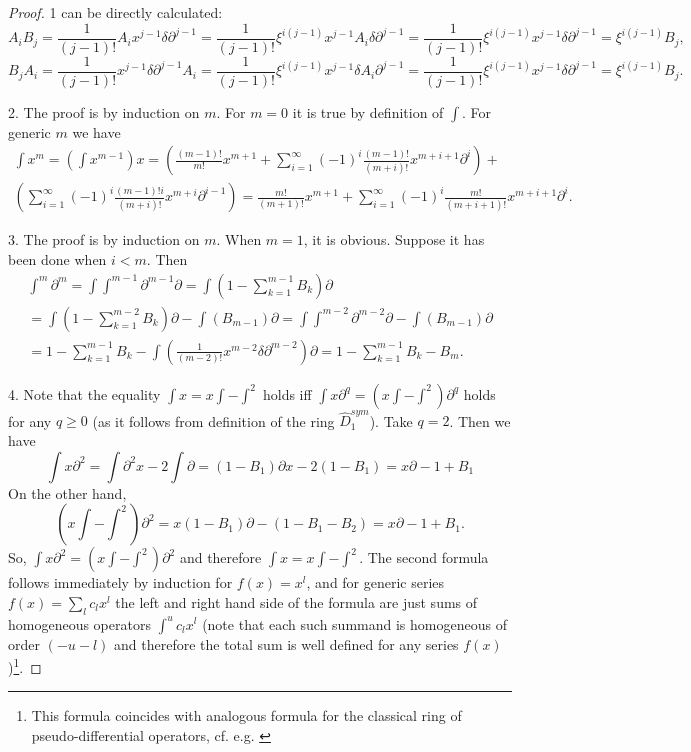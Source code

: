 \documentclass[11pt]{article}
\theoremstyle{definition}
\theoremstyle{plain}
\numberwithin{equation}{section}
\begin{document}
\begin{proof} 	
	1 can be directly calculated:
	$$
	A_{i}B_{j}=\frac{1}{(j-1)!}A_{i}x^{j-1}\delta \partial^{j-1}=\frac{1}{(j-1)!}\xi^{i(j-1)}x^{j-1}A_{i}\delta \partial^{j-1}=\frac{1}{(j-1)!}\xi^{i(j-1)}x^{j-1}\delta \partial^{j-1}=\xi^{i(j-1)}B_{j},
	$$ 
	$$
	B_{j}A_{i}=\frac{1}{(j-1)!}x^{j-1}\delta \partial^{j-1}A_{i}=\frac{1}{(j-1)!}\xi^{i(j-1)}x^{j-1}\delta A_{i}\partial^{j-1}=\frac{1}{(j-1)!}\xi^{i(j-1)}x^{j-1}\delta \partial^{j-1}=\xi^{i(j-1)}B_{j}.
	$$ 
	
	2. The proof is by induction on $m$. 
For $m=0$ it is true by definition of $\int$. For generic $m$ we have
\begin{multline*}
\int x^m = (\int x^{m-1})x= (\frac{(m-1)!}{m!}x^{m+1} + \sum_{i=1}^{\infty}(-1)^i \frac{(m-1)!}{(m+i)!}x^{m+i+1}\partial^i )+ \\
(\sum_{i=1}^{\infty}(-1)^i \frac{(m-1)!i}{(m+i)!}x^{m+i}\partial^{i-1})=
\frac{m!}{(m+1)!}x^{m+1} + \sum_{i=1}^{\infty}(-1)^i \frac{m!}{(m+i+1)!}x^{m+i+1}\partial^i.
\end{multline*}
	
	
	3. The proof is by induction on $m$.  When $m=1$, it is obvious. Suppose it has been done when $i<m$. Then
\begin{multline*}
	\int^{m} \partial^{m}=\int \int^{m-1} \partial^{m-1} \partial=\int(1-\sum_{k=1}^{m-1}B_{k})   \partial
\\  =\int(1-\sum_{k=1}^{m-2}B_{k})   \partial-\int(B_{m-1})  \partial=\int \int^{m-2} \partial^{m-2} \partial-\int(B_{m-1})  \partial
\\	=1-\sum_{k=1}^{m-1}B_{k}-\int (\frac{1}{(m-2)!}x^{m-2}\delta \partial^{m-2})\partial=1-\sum_{k=1}^{m-1}B_{k}-B_{m}.
\end{multline*}
	
	
	4. Note that the equality $\int x=x\int-\int^2$ holds iff $\int x\partial^q=(x\int-\int^2)\partial^q$ holds for any $q\ge 0$ (as it follows from definition of the ring $\hat{D}_1^{sym}$). Take $q=2$. Then we have 
	$$
\int x\partial^2=\int \partial^2x - 2\int \partial = (1-B_1)\partial x-2(1-B_1)= x\partial -1 +B_1
	$$
	On the other hand, 
	$$
(x\int-\int^2)\partial^2=x(1-B_1)\partial - (1-B_1-B_2)=x\partial -1+B_1.
	$$
	So, $\int x\partial^2=(x\int-\int^2)\partial^2$ and therefore $\int x=x\int-\int^2$. The second formula follows immediately by induction  for $f(x)=x^l$, and for generic series $f(x)=\sum_l c_lx^l$ the left and right hand side of the formula are just sums of homogeneous operators $\int^uc_lx^l$ (note that each such summand  is homogeneous of order $(-u-l)$ and therefore the total sum is well defined for any series $f(x)$)\footnote{This formula coincides with analogous formula for the classical ring of pseudo-differential operators, cf. e.g. \cite[Def. 4.1]{Zheglov_book}}. 
	

\end{proof}
\end{document}
